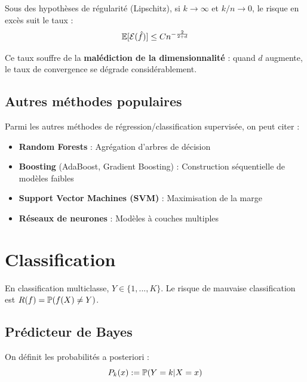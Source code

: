 \begin{proposition}
Sous des hypothèses de régularité (Lipschitz), si $k \to \infty$ et $k/n \to 0$, le risque en excès suit le taux :
\begin{equation}
\mathbb{E}[\mathcal{E}(\hat{f})]\le Cn^{-\frac{2}{2+d}}
\end{equation}
\end{proposition}

\begin{remarque}
Ce taux souffre de la \textbf{malédiction de la dimensionnalité} : quand $d$ augmente, le taux de convergence se dégrade considérablement.
\end{remarque}

\subsection{Autres méthodes populaires}

Parmi les autres méthodes de régression/classification supervisée, on peut citer :
\begin{itemize}
    \item \textbf{Random Forests} : Agrégation d'arbres de décision
    \item \textbf{Boosting} (AdaBoost, Gradient Boosting) : Construction séquentielle de modèles faibles
    \item \textbf{Support Vector Machines (SVM)} : Maximisation de la marge
    \item \textbf{Réseaux de neurones} : Modèles à couches multiples
\end{itemize}

\section{Classification}

En classification multiclasse, $Y \in \{1,...,K\}$. Le risque de mauvaise classification est $R(f) = \mathbb{P}(f(X) \ne Y)$.

\subsection{Prédicteur de Bayes}

\begin{definition}
On définit les probabilités a posteriori :
\begin{equation}
P_{k}(x) := \mathbb{P}(Y=k|X=x)
\end{equation}
\end{definition}

